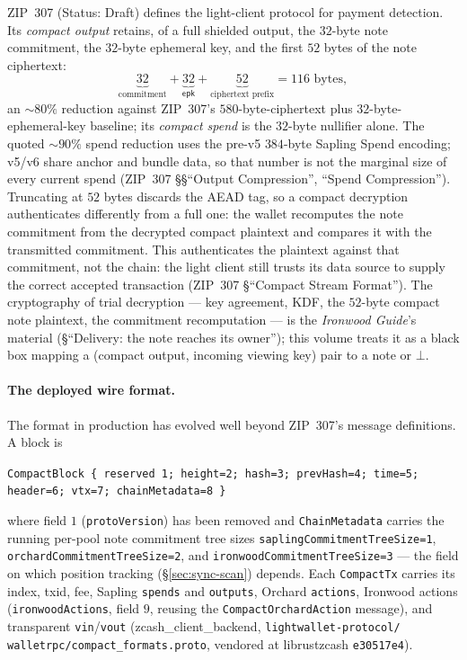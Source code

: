 \documentclass[11pt,a4paper]{article}
\theoremstyle{definition}
\begin{document}
ZIP~307 (Status: Draft) defines the light-client protocol for payment
detection. Its \emph{compact output} retains, of a full shielded output, the
$32$-byte note commitment, the $32$-byte ephemeral key, and the first $52$
bytes of the note ciphertext:
\[
\underbrace{32}_{\text{commitment}} + \underbrace{32}_{\mathsf{epk}} +
\underbrace{52}_{\text{ciphertext prefix}} = 116 \text{ bytes},
\]
an ${\sim}80\%$ reduction against ZIP~307's $580$-byte-ciphertext plus
$32$-byte-ephemeral-key baseline; its \emph{compact spend} is the $32$-byte
nullifier alone. The quoted ${\sim}90\%$ spend reduction uses the pre-v5
$384$-byte Sapling Spend encoding; v5/v6 share anchor and bundle data, so
that number is not the marginal size of every current spend
(ZIP~307 \S\S``Output Compression'', ``Spend Compression'').
Truncating at $52$ bytes discards the AEAD tag, so a compact decryption
authenticates differently from a full one: the wallet recomputes the note
commitment from the decrypted compact plaintext and compares it with the
transmitted commitment. This authenticates the plaintext against that
commitment, not the chain: the light client still trusts its data source
to supply the correct accepted transaction
(ZIP~307 \S``Compact Stream Format''). The cryptography of trial decryption
--- key agreement, KDF, the $52$-byte compact note plaintext, the commitment
recomputation --- is the \emph{Ironwood Guide}'s material (\S``Delivery: the
note reaches its owner''); this volume treats it as a black box mapping a
(compact
output, incoming viewing key) pair to a note or $\bot$.

\paragraph{The deployed wire format.} The format in production has evolved
well beyond ZIP~307's message definitions. A block is
\begin{center}
\texttt{CompactBlock \{ reserved 1; height=2; hash=3; prevHash=4; time=5;}\\
\texttt{header=6; vtx=7; chainMetadata=8 \}}
\end{center}
where field $1$ (\texttt{protoVersion}) has been removed and
\texttt{ChainMetadata} carries the running per-pool note commitment tree
sizes \texttt{saplingCommitmentTreeSize=1},
\texttt{orchardCommitmentTreeSize=2}, and
\texttt{ironwoodCommitmentTreeSize=3} --- the field on which position
tracking (\S\ref{sec:sync-scan}) depends. Each \texttt{CompactTx} carries
its index, txid, fee, Sapling \texttt{spends} and \texttt{outputs}, Orchard
\texttt{actions}, Ironwood actions (\texttt{ironwoodActions}, field $9$,
reusing the \texttt{CompactOrchardAction} message), and transparent
\texttt{vin}/\texttt{vout}
(\textsf{zcash\_client\_backend}, \texttt{lightwallet-protocol/}%
\allowbreak\texttt{walletrpc/compact\_formats.proto}, vendored at
\textsf{librustzcash} \texttt{e30517e4}).
\end{document}
